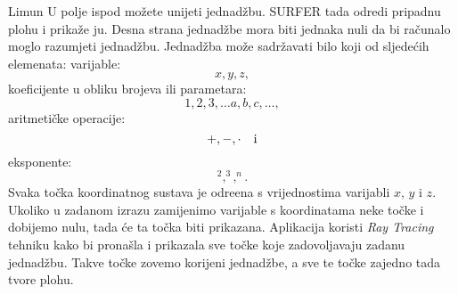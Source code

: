 \begin{surferPage}{Limun}
U polje ispod mo\v zete unijeti jednad\v zbu. SURFER tada odredi pripadnu plohu i prika\v ze ju. Desna strana jednad\v zbe mora biti jednaka nuli da bi ra\v cunalo moglo razumjeti jednad\v zbu.
\newline \newline
Jednad\v zba mo\v ze sadr\v zavati bilo koji od sljede\' cih elemenata:
\newline \newline
varijable:
\[x, y, z, \]
koeficijente u obliku brojeva ili parametara:
\[1, 2, 3, \dots a, b, c, \dots, \]
aritmeti\v cke operacije:
\[+,  - , \cdot \quad \textnormal{i} \]
eksponente:
\[ ^2, ^3, ^n .\]
Svaka to\v cka koordinatnog sustava je odre\dj ena s vrijednostima varijabli $x$, $y$ i $z$. Ukoliko u zadanom izrazu zamijenimo varijable s koordinatama neke to\v cke i dobijemo nulu, tada \' ce ta to\v cka biti prikazana. Aplikacija koristi \textit{Ray Tracing} tehniku kako bi prona\v sla i prikazala sve to\v cke koje zadovoljavaju zadanu jednad\v zbu. Takve to\v cke zovemo korijeni jednad\v zbe, a sve te to\v cke zajedno tada tvore plohu.
\end{surferPage}
